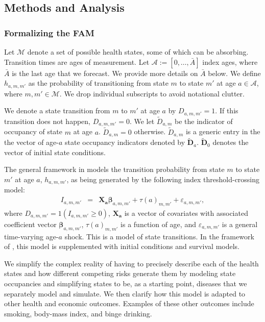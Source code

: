 \subsection{Methods and Analysis}

\subsubsection{Formalizing the FAM}
\label{section:transition_models}

Let $\mathcal{M}$ denote a set of possible health states, some of which can be absorbing. Transition times are ages of measurement. Let $\mathcal{A}:= [ 0, \ldots, \bar{A}]$ index ages, where $\bar{A}$ is the last age that we forecast. We provide more details on $\bar{A}$ below. We define $h_{a,m,m'}$ as the probability of transitioning from state $m$ to state $m'$ at age $a \in \mathcal{A}$, where $m, m' \in \mathcal{M}$. We drop individual subscripts to avoid notational clutter.

We denote a state transition from $m$ to $m'$ at age $a$ by $D_{a,m,m'} = 1$. If this transition does not happen,  $D_{a,m,m'} = 0$. We let $\tilde{D}_{a,m}$ be the indicator of occupancy of state $m$ at age $a$. $\tilde{D}_{a,m} = 0$ otherwise. $\tilde{D}_{a,m}$ is a generic entry in the the vector of age-$a$ state occupancy indicators denoted by $\tilde{\bm{D}}_a$. $\tilde{\bm{D}}_0$ denotes the vector of initial state conditions.

The general framework in \citet{Heckman_1981_heterogeneity,Heckman_1981_IncidentalParametersProblem} models the transition probability from state $m$ to state $m'$ at age $a$, $h_{a,m,m'}$, as being generated by the following index threshold-crossing model:
\begin{eqnarray}
I_{a,m,m'} &=& \bm{X_a} \bm{\beta}_{a,m,m'} + \tau \left( a \right)_{m,m'} + \varepsilon_{a,m,m'}, \label{eq:trans0}
\end{eqnarray}
where $D_{a,m,m'} = \bm{\mathit{1}}  \left( I_{a,m,m'} \geq 0 \right)$, $\bm{X_a}$ is a vector of covariates with associated coefficient vector $ \bm{\beta}_{a,m,m'}$, $\tau \left( a \right)_{m,m'}$ is a function of age, and $\varepsilon_{a,m,m'}$ is a general time-varying age-$a$ shock. This is a model of state transitions. In the framework of  \citet{Heckman_1981_heterogeneity,Heckman_1981_IncidentalParametersProblem}, this model is supplemented with initial conditions and survival models.

We simplify the complex reality of having to precisely describe each of the health states and how different competing risks generate them by modeling state occupancies and simplifying states to be, as a starting point, diseases that we separately model and simulate. We then clarify how this model is adapted to other health and economic outcomes. Examples of these other outcomes include smoking, body-mass index, and binge drinking.

